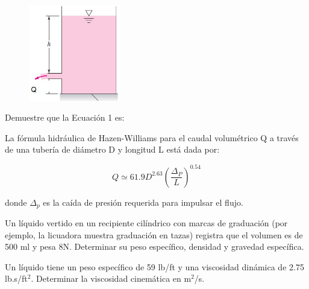 \documentclass[12pt, a4paper]{exam}
\begin{document}
\begin{questions}
    \begin{figure}[h]
    \includegraphics[width=4cm]{CAUDAL P1.jpg}
    \centering
    \end{figure}

	Demuestre que la Ecuación 1 es:
	

	\question La fórmula hidráulica de Hazen-Williams para el caudal volumétrico Q a través de una tubería de diámetro D y longitud L está dada por:
	
	\begin{equation}
    Q \simeq 61.9 D^{2.63} \left( \frac{\Delta_{P}}{L} \right)^{0.54}
    \end{equation}	
		
	donde $\Delta_p$  es la caída de presión requerida para impulsar el flujo.
	\vspace{0.2in}
	
    \question Un líquido vertido en un recipiente cilíndrico con marcas de graduación (por ejemplo, la licuadora muestra graduación en tazas) registra que el volumen es de 500 ml y pesa 8N. Determinar su peso específico, densidad y gravedad específica.

    \question Un líquido tiene un peso específico de 59 lb/ft y una viscosidad dinámica de 2.75 lb.s/ft$^2$. Determinar la viscosidad cinemática en m$^2$/s. 
    

\end{questions}
\end{document}
